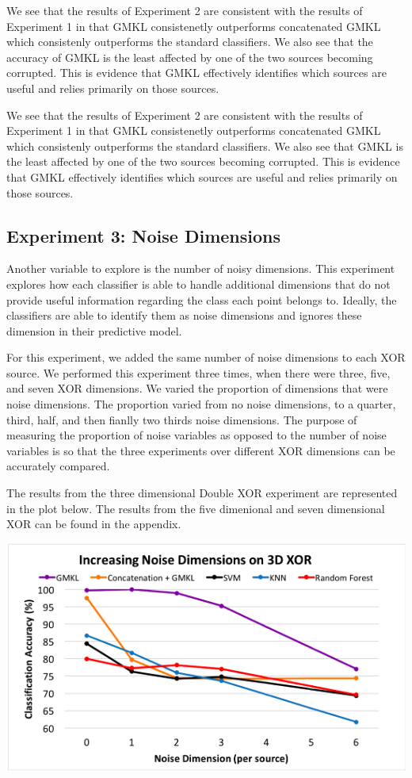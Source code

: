 \documentclass{article}
\begin{document}
We see that the results of Experiment 2 are consistent with the results of Experiment 1 in that GMKL consistenetly outperforms concatenated GMKL which consistenly outperforms the standard classifiers. We also see that the accuracy of GMKL is the least affected by one of the two sources becoming corrupted. This is evidence that GMKL effectively identifies which sources are useful and relies primarily on those sources.

We see that the results of Experiment 2 are consistent with the results of Experiment 1 in that GMKL consistenetly outperforms concatenated GMKL which consistenly outperforms the standard classifiers. We also see that GMKL is the least affected by one of the two sources becoming corrupted. This is evidence that GMKL effectively identifies which sources are useful and relies primarily on those sources.



\subsection*{Experiment 3: Noise Dimensions}

Another variable to explore is the number of noisy dimensions. This experiment explores how each classifier is able to handle additional dimensions that do not provide useful information regarding the class each point belongs to. Ideally, the classifiers are able to identify them as noise dimensions and ignores these dimension in their predictive model.

For this experiment, we added the same number of noise dimensions to each XOR source. We performed this experiment three times, when there were three, five, and seven XOR dimensions. We varied the proportion of dimensions that were noise dimensions. The proportion varied from no noise dimensions, to a quarter, third, half, and then fianlly two thirds noise dimensions. The purpose of measuring the proportion of noise variables as opposed to the number of noise variables is so that the three experiments over different XOR dimensions can be accurately compared.

The results from the three dimensional Double XOR experiment are represented in the plot below. The results from the five dimenional and seven dimensional XOR can be found in the appendix.

\begin{center}
\includegraphics[scale=0.7]{Noise_Dim_line.png}
\end{center}
\end{document}
